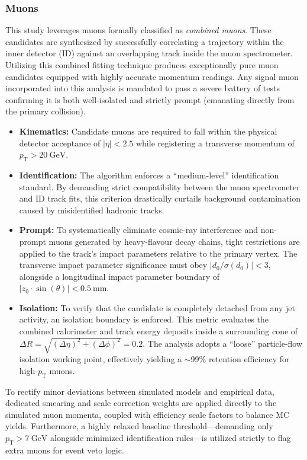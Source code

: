 \subsubsection{Muons}
This study leverages muons formally classified as \textit{combined muons}. These candidates are synthesized by successfully correlating a trajectory within the inner detector (ID) against an overlapping track inside the muon spectrometer. Utilizing this combined fitting technique produces exceptionally pure muon candidates equipped with highly accurate momentum readings.
%
Any signal muon incorporated into this analysis is mandated to pass a severe battery of tests confirming it is both well-isolated and strictly prompt (emanating directly from the primary collision).
\begin{itemize}
    \item \textbf{Kinematics:} Candidate muons are required to fall within the physical detector acceptance of $|\eta| < 2.5$ while registering a transverse momentum of $p_{\text{T}} > 20~\text{GeV}$.
    \item \textbf{Identification:} The algorithm enforces a ``medium-level'' identification standard. By demanding strict compatibility between the muon spectrometer and ID track fits, this criterion drastically curtails background contamination caused by misidentified hadronic tracks.
    \item \textbf{Prompt:} To systematically eliminate cosmic-ray interference and non-prompt muons generated by heavy-flavour decay chains, tight restrictions are applied to the track's impact parameters relative to the primary vertex. The transverse impact parameter significance must obey $|d_0/\sigma(d_0)| < 3$, alongside a longitudinal impact parameter boundary of $|z_0 \cdot \sin(\theta)| < 0.5~\text{mm}$.
    \item \textbf{Isolation:} To verify that the candidate is completely detached from any jet activity, an isolation boundary is enforced. This metric evaluates the combined calorimeter and track energy deposits inside a surrounding cone of $\Delta R = \sqrt{(\Delta\eta)^2+(\Delta\phi)^2} = 0.2$. The analysis adopts a ``loose'' particle-flow isolation working point, effectively yielding a $\sim$99\% retention efficiency for high-$p_{\text{T}}$ muons.
\end{itemize}
To rectify minor deviations between simulated models and empirical data, dedicated smearing and scale correction weights are applied directly to the simulated muon momenta, coupled with efficiency scale factors to balance MC yields. Furthermore, a highly relaxed baseline threshold—demanding only $p_{\text{T}} > 7~\text{GeV}$ alongside minimized identification rules—is utilized strictly to flag extra muons for event veto logic.

